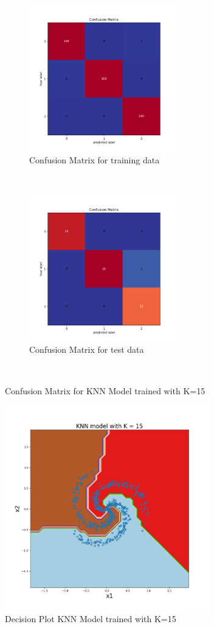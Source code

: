 \begin{figure}[!ht]
    \centering
    \begin{subfigure}[t]{0.5\textwidth}
        \centering
        \includegraphics[height=2.5in]{Dataset_1b/K_15_cmatrix_train_data.png}
        \caption{Confusion Matrix for training data}
    \end{subfigure}%
    ~ 
    \begin{subfigure}[t]{0.5\textwidth}
        \centering
        \includegraphics[height=2.5in]{Dataset_1b/K_15_cmatrix_test_data.png}
        \caption{Confusion Matrix for test data}
    \end{subfigure}%
    ~
    \caption{Confusion Matrix for KNN Model trained with K=15}
    \label{fig:17}
\end{figure}
\begin{figure}[!ht]
    \centering
    \includegraphics[height=3.5in]{Dataset_1b/K_15_decision_plot.png}
    \caption{Decision Plot KNN Model trained with K=15}
    \label{fig:18}
\end{figure}

